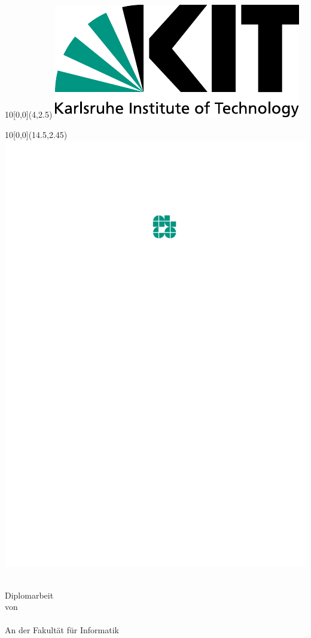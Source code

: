 
\newcommand{\diameter}{7}
\newcommand{\xone}{-15}
\newcommand{\xtwo}{160}
\newcommand{\yone}{15}
\newcommand{\ytwo}{-253}

\begin{titlepage}
	\begin{textblock}{10}[0,0](4,2.5)
		\includegraphics[width=.3\textwidth]{logos/KITLogo.pdf}
	\end{textblock}
        \begin{textblock}{10}[0,0](14.5,2.45)
		\includegraphics[width=.15\textwidth]{logos/algoLogo.pdf}
	\end{textblock}
	\vspace*{3.75cm}
	\begin{center}
		\Huge{\mytitle}
		\vspace*{2.25cm}\\
		\Large{
												  {Diplomarbeit\\von}
		}\\
		\vspace*{1cm}
		\huge{\myname}\\
		\vspace*{1cm}
		\Large{
													{An der Fakult\"at f\"ur Informatik}
			\\
			\myinstitute
		}
	\end{center}
	\vspace*{1cm}
\Large{
\begin{center}

\end{center}}
\end{titlepage}
